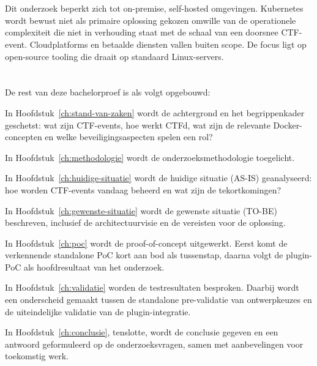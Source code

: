 \section{}%
\label{sec:scope}

Dit onderzoek beperkt zich tot on-premise, self-hosted omgevingen. Kubernetes wordt bewust niet als primaire oplossing gekozen omwille van de operationele complexiteit die niet in verhouding staat met de schaal van een doorsnee CTF-event. Cloudplatforms en betaalde diensten vallen buiten scope. De focus ligt op open-source tooling die draait op standaard Linux-servers.

\section{}%
\label{sec:opzet-bachelorproef}

De rest van deze bachelorproef is als volgt opgebouwd:

In Hoofdstuk~\ref{ch:stand-van-zaken} wordt de achtergrond en het begrippenkader geschetst: wat zijn CTF-events, hoe werkt CTFd, wat zijn de relevante Docker-concepten en welke beveiligingsaspecten spelen een rol?

In Hoofdstuk~\ref{ch:methodologie} wordt de onderzoeksmethodologie toegelicht.

In Hoofdstuk~\ref{ch:huidige-situatie} wordt de huidige situatie (AS-IS) geanalyseerd: hoe worden CTF-events vandaag beheerd en wat zijn de tekortkomingen?

In Hoofdstuk~\ref{ch:gewenste-situatie} wordt de gewenste situatie (TO-BE) beschreven, inclusief de architectuurvisie en de vereisten voor de oplossing.

In Hoofdstuk~\ref{ch:poc} wordt de proof-of-concept uitgewerkt. Eerst komt de verkennende standalone PoC kort aan bod als tussenstap, daarna volgt de plugin-PoC als hoofdresultaat van het onderzoek.

In Hoofdstuk~\ref{ch:validatie} worden de testresultaten besproken. Daarbij wordt een onderscheid gemaakt tussen de standalone pre-validatie van ontwerpkeuzes en de uiteindelijke validatie van de plugin-integratie.

In Hoofdstuk~\ref{ch:conclusie}, tenslotte, wordt de conclusie gegeven en een antwoord geformuleerd op de onderzoeksvragen, samen met aanbevelingen voor toekomstig werk.
